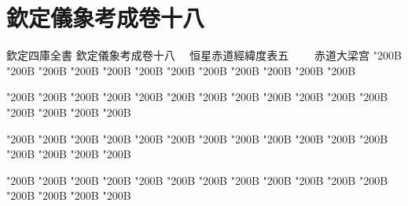 \chapter*{欽定儀象考成卷十八}
\begin{正文}
欽定四庫全書
欽定儀象考成卷十八
　恒星赤道經緯度表五
　　赤道大梁宫
\char"200B\relax{}
\char"200B\relax{}
\char"200B\relax{}
\char"200B\relax{}
\char"200B\relax{}
\char"200B\relax{}
\char"200B\relax{}
\char"200B\relax{}
\char"200B\relax{}
\char"200B\relax{}
\char"200B\relax{}
\char"200B\relax
\par
\end{正文}\clearpage
{}
\begin{正文}
\char"200B\relax{}
\char"200B\relax{}
\char"200B\relax{}
\char"200B\relax{}
\char"200B\relax{}
\char"200B\relax{}
\char"200B\relax{}
\char"200B\relax{}
\char"200B\relax{}
\char"200B\relax{}
\char"200B\relax{}
\char"200B\relax{}
\char"200B\relax{}
\char"200B\relax{}
\char"200B\relax{}
\char"200B\relax
{}\par
\end{正文}\clearpage
{}
\begin{正文}
\char"200B\relax{}
\char"200B\relax{}
\char"200B\relax{}
\char"200B\relax{}
\char"200B\relax{}
\char"200B\relax{}
\char"200B\relax{}
\char"200B\relax{}
\char"200B\relax{}
\char"200B\relax{}
\char"200B\relax{}
\char"200B\relax{}
\char"200B\relax{}
\char"200B\relax{}
\char"200B\relax{}
\char"200B\relax
{}\par
\end{正文}\clearpage
{}
\begin{正文}
\char"200B\relax{}
\char"200B\relax{}
\char"200B\relax{}
\char"200B\relax{}
\char"200B\relax{}
\char"200B\relax{}
\char"200B\relax{}
\char"200B\relax{}
\char"200B\relax{}
\char"200B\relax{}
\char"200B\relax{}
\char"200B\relax{}
\char"200B\relax{}
\char"200B\relax{}
\char"200B\relax{}
\char"200B\relax
{}\par
\end{正文}\clearpage
